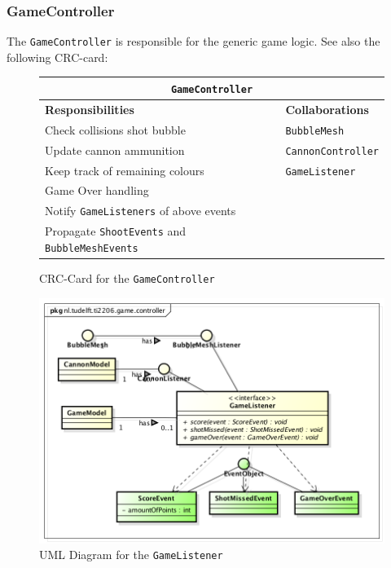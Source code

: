 \documentclass[a4paper]{article}
\begin{document}
\subsubsection*{GameController}
The \texttt{GameController} is responsible for the generic game logic. See also the following CRC-card:

\begin{figure}[H]
    \begin{center}
    \begin{tabular}{ | p{8cm} | p{4cm} | }
      \multicolumn{2}{c}{\texttt{GameController}} \\ \hline
      \textbf{Responsibilities} & \textbf{Collaborations} \\ \hline
      Check collisions shot bubble & \texttt{BubbleMesh} \\
      Update cannon ammunition & \texttt{CannonController} \\
      Keep track of remaining colours & \texttt{GameListener} \\
      Game Over handling & \\
      Notify \texttt{GameListeners} of above events & \\
      Propagate \texttt{ShootEvents} and \texttt{BubbleMeshEvents} & \\
      \hline
    \end{tabular}
    \end{center}
    \caption{CRC-Card for the \texttt{GameController}}
\end{figure}

\begin{figure}[H]
    \centering
    \includegraphics[scale=0.5]{GameListener.png}
    \caption{UML Diagram for the \texttt{GameListener}}
\end{figure}
\end{document}
